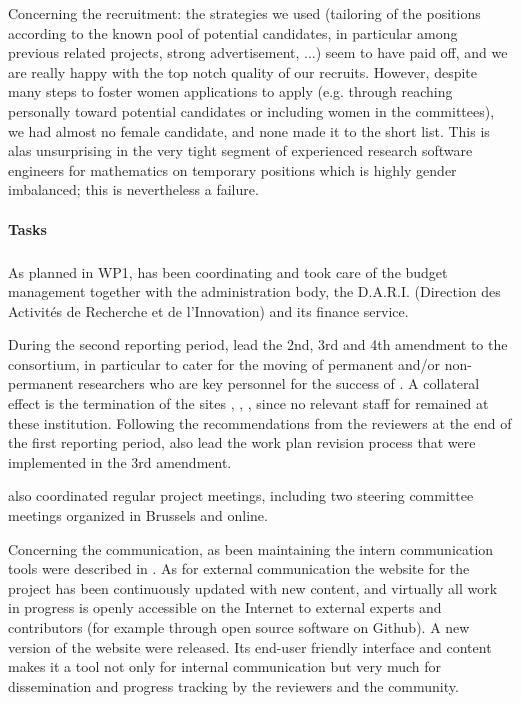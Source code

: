 Concerning the recruitment: the strategies we used (tailoring of the
positions according to the known pool of potential candidates, in
particular among previous related projects, strong advertisement, ...)
seem to have paid off, and we are really happy with the top notch
quality of our recruits. However, despite many steps to foster women
applications to apply (e.g. through reaching personally toward
potential candidates or including women in the committees), we had
almost no female candidate, and none made it to the short list. This
is alas unsurprising in the very tight segment of experienced research
software engineers for mathematics on temporary positions which is
highly gender imbalanced; this is nevertheless a failure.

\paragraph{Tasks}

\subparagraph{}

As planned in WP1,  has been coordinating \ODK and took care
of the budget management together with the administration body, the
D.A.R.I. (Direction des Activités de Recherche et de l'Innovation) and
its finance service.

During the second reporting period,  lead the 2nd, 3rd and
4th amendment to the consortium, in particular to cater for the moving
of permanent and/or non-permanent researchers who are key personnel
for the success of \ODK. A collateral effect is the termination of the
sites , , ,  since no relevant
staff for \ODK remained at these institution. Following the
recommendations from the reviewers at the end of the first reporting
period,  also lead the work plan revision process that were
implemented in the 3rd amendment.

 also coordinated regular project meetings, including two
steering committee meetings organized in Brussels and online.

Concerning the communication,  as been maintaining the intern
communication tools were described in
. As for external
communication the website for the project has been continuously
updated with new content, and virtually all work in progress is openly
accessible on the Internet to external experts and contributors (for
example through open source software on Github). A new version of the
website were released. Its end-user friendly interface and content
makes it a tool not only for internal communication but very much for
dissemination and progress tracking by the reviewers and the
community.

